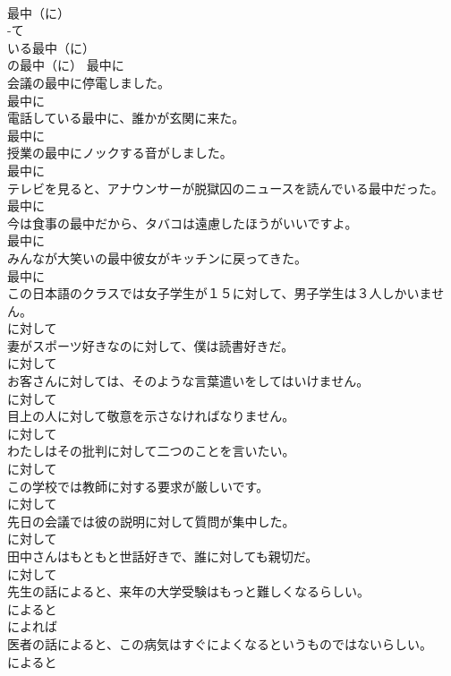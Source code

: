 \documentclass[8pt]{extreport}
\begin{document}
\begin{CJK}{UTF8}{min}
\\	最中（に）	
\\	-て
\\	いる最中（に）	
\\	の最中（に）	最中に
\\	会議の最中に停電しました。	
\\	最中に
\\	電話している最中に、誰かが玄関に来た。	
\\	最中に
\\	授業の最中にノックする音がしました。	
\\	最中に
\\	テレビを見ると、アナウンサーが脱獄囚のニュースを読んでいる最中だった。	
\\	最中に
\\	今は食事の最中だから、タバコは遠慮したほうがいいですよ。	
\\	最中に
\\	みんなが大笑いの最中彼女がキッチンに戻ってきた。	
\\	最中に
\\	この日本語のクラスでは女子学生が１５に対して、男子学生は３人しかいません。	
\\	に対して
\\	妻がスポーツ好きなのに対して、僕は読書好きだ。	
\\	に対して
\\	お客さんに対しては、そのような言葉遣いをしてはいけません。	
\\	に対して
\\	目上の人に対して敬意を示さなければなりません。	
\\	に対して
\\	わたしはその批判に対して二つのことを言いたい。	
\\	に対して
\\	この学校では教師に対する要求が厳しいです。	
\\	に対して
\\	先日の会議では彼の説明に対して質問が集中した。	
\\	に対して
\\	田中さんはもともと世話好きで、誰に対しても親切だ。	
\\	に対して
\\	先生の話によると、来年の大学受験はもっと難しくなるらしい。	
\\	によると 
\\	によれば
\\	医者の話によると、この病気はすぐによくなるというものではないらしい。	
\\	によると 

\end{CJK}
\end{document}
